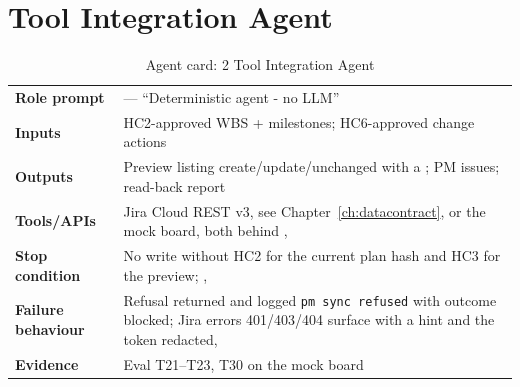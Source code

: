 \section{Tool Integration Agent}
\begin{table}[H]
\centering\footnotesize
\caption{Agent card: 2 Tool Integration Agent}
\label{tab:card-tool}
\begin{tabularx}{\textwidth}{>{\raggedright\arraybackslash}p{2.9cm}L}
\toprule
\textbf{Role prompt} &  --- ``Deterministic agent - no LLM'' \\
\textbf{Inputs} & HC2-approved WBS + milestones; HC6-approved change actions \\
\textbf{Outputs} & Preview listing create/update/unchanged with a ; PM issues; read-back report \\
\textbf{Tools/APIs} & Jira Cloud REST v3, see Chapter~\ref{ch:datacontract}, or the mock board, both behind ,  \\
\textbf{Stop condition} & No write without HC2 for the current plan hash and HC3 for the preview; ,  \\
\textbf{Failure behaviour} & Refusal returned and logged \texttt{pm sync refused} with outcome blocked; Jira errors 401/403/404 surface with a hint and the token redacted,  \\
\textbf{Evidence} & Eval T21--T23, T30 on the mock board \\
\bottomrule
\end{tabularx}
\end{table}

